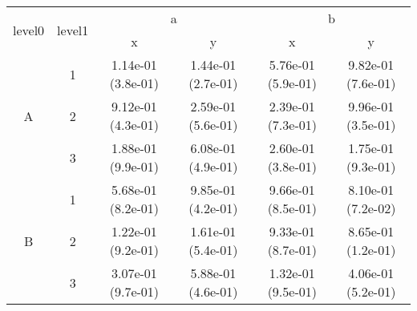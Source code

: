 \begin{tabular}{cccccc}
\toprule
\multirow{2}{*}{level0} & \multirow{2}{*}{level1}&\multicolumn{2}{c}{a}&\multicolumn{2}{c}{b}\tabularnewline
\cmidrule(lr){3-4}
\cmidrule(lr){5-6}
&&x&y&x&y\tabularnewline
\midrule
\multirow{3}{*}{A}&1& 1.14e-01 (3.8e-01)& 1.44e-01 (2.7e-01)& 5.76e-01 (5.9e-01)& 9.82e-01 (7.6e-01)\tabularnewline
&2& 9.12e-01 (4.3e-01)& 2.59e-01 (5.6e-01)& 2.39e-01 (7.3e-01)& 9.96e-01 (3.5e-01)\tabularnewline
&3& 1.88e-01 (9.9e-01)& 6.08e-01 (4.9e-01)& 2.60e-01 (3.8e-01)& 1.75e-01 (9.3e-01)\tabularnewline
\midrule
\multirow{3}{*}{B}&1& 5.68e-01 (8.2e-01)& 9.85e-01 (4.2e-01)& 9.66e-01 (8.5e-01)& 8.10e-01 (7.2e-02)\tabularnewline
&2& 1.22e-01 (9.2e-01)& 1.61e-01 (5.4e-01)& 9.33e-01 (8.7e-01)& 8.65e-01 (1.2e-01)\tabularnewline
&3& 3.07e-01 (9.7e-01)& 5.88e-01 (4.6e-01)& 1.32e-01 (9.5e-01)& 4.06e-01 (5.2e-01)\tabularnewline
\bottomrule
\end{tabular}
